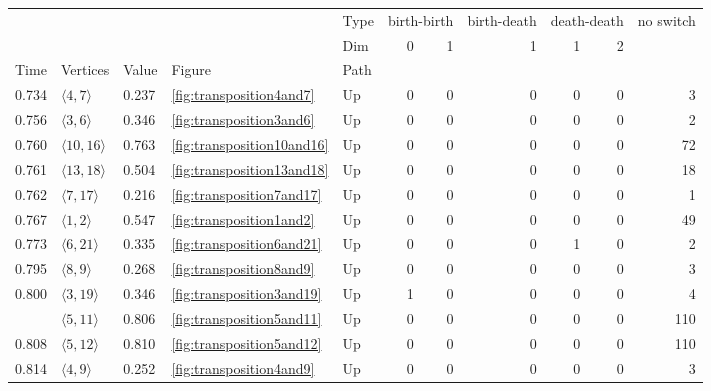 \documentclass{article}
\begin{document}
\begin{center}
\begin{tabular}{lllllrrrrrr}
\toprule
 &  &  &  & Type & \multicolumn{2}{r}{birth-birth} & birth-death & \multicolumn{2}{r}{death-death} & no switch \\
 &  &  &  & Dim & 0 & 1 & 1 & 1 & 2 &  \\
Time & Vertices & Value & Figure & Path &  &  &  &  &  &  \\
\midrule
0.734 & $\langle4, 7\rangle$ & 0.237 & \ref{fig:transposition4and7} & Up & 0 & 0 & 0 & 0 & 0 & 3 \\
\cline{1-11} \cline{2-11} \cline{3-11} \cline{4-11}
0.756 & $\langle3, 6\rangle$ & 0.346 & \ref{fig:transposition3and6} & Up & 0 & 0 & 0 & 0 & 0 & 2 \\
\cline{1-11} \cline{2-11} \cline{3-11} \cline{4-11}
0.760 & $\langle10, 16\rangle$ & 0.763 & \ref{fig:transposition10and16} & Up & 0 & 0 & 0 & 0 & 0 & 72 \\
\cline{1-11} \cline{2-11} \cline{3-11} \cline{4-11}
0.761 & $\langle13, 18\rangle$ & 0.504 & \ref{fig:transposition13and18} & Up & 0 & 0 & 0 & 0 & 0 & 18 \\
\cline{1-11} \cline{2-11} \cline{3-11} \cline{4-11}
0.762 & $\langle7, 17\rangle$ & 0.216 & \ref{fig:transposition7and17} & Up & 0 & 0 & 0 & 0 & 0 & 1 \\
\cline{1-11} \cline{2-11} \cline{3-11} \cline{4-11}
0.767 & $\langle1, 2\rangle$ & 0.547 & \ref{fig:transposition1and2} & Up & 0 & 0 & 0 & 0 & 0 & 49 \\
\cline{1-11} \cline{2-11} \cline{3-11} \cline{4-11}
0.773 & $\langle6, 21\rangle$ & 0.335 & \ref{fig:transposition6and21} & Up & 0 & 0 & 0 & 1 & 0 & 2 \\
\cline{1-11} \cline{2-11} \cline{3-11} \cline{4-11}
0.795 & $\langle8, 9\rangle$ & 0.268 & \ref{fig:transposition8and9} & Up & 0 & 0 & 0 & 0 & 0 & 3 \\
\cline{1-11} \cline{2-11} \cline{3-11} \cline{4-11}
\multirow[t]{2}{*}{0.800} & $\langle3, 19\rangle$ & 0.346 & \ref{fig:transposition3and19} & Up & 1 & 0 & 0 & 0 & 0 & 4 \\
\cline{2-11} \cline{3-11} \cline{4-11}
 & $\langle5, 11\rangle$ & 0.806 & \ref{fig:transposition5and11} & Up & 0 & 0 & 0 & 0 & 0 & 110 \\
\cline{1-11} \cline{2-11} \cline{3-11} \cline{4-11}
0.808 & $\langle5, 12\rangle$ & 0.810 & \ref{fig:transposition5and12} & Up & 0 & 0 & 0 & 0 & 0 & 110 \\
\cline{1-11} \cline{2-11} \cline{3-11} \cline{4-11}
0.814 & $\langle4, 9\rangle$ & 0.252 & \ref{fig:transposition4and9} & Up & 0 & 0 & 0 & 0 & 0 & 3 \\

\end{tabular}
\end{center}
\end{document}

